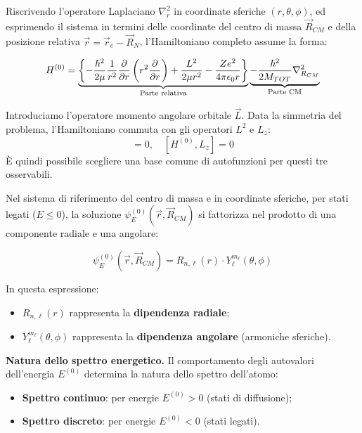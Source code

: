 Riscrivendo l'operatore Laplaciano \(\nabla_r^2\) in coordinate sferiche \((r, \theta, \phi)\), ed esprimendo il sistema in termini delle coordinate del centro di massa \(\vec{R}_{CM}\) e della posizione relativa \(\vec{r} = \vec{r}_e - \vec{R}_N\), l'Hamiltoniano completo assume la forma:

\begin{equation}
    H^{(0)} = \underbrace{\left\{ -\frac{\hbar^2}{2\mu} \frac{1}{r^2} \pdv{r} \left( r^2 \pdv{r} \right) + \frac{L^2}{2\mu r^2} - \frac{Ze^2}{4\pi\epsilon_0 r} \right\}}_{\text{Parte relativa}} \underbrace{- \frac{\hbar^2}{2M_{TOT}} \nabla_{R_{CM}}^2}_{\text{Parte CM}}
\end{equation}

Introduciamo l'operatore momento angolare orbitale \(\vec{L}\). Data la simmetria del problema, l'Hamiltoniano commuta con gli operatori \(L^2\) e \(L_z\):
\begin{equation}
    [H^{(0)}, L^2] = 0, \quad [H^{(0)}, L_z] = 0
\end{equation}
È quindi possibile scegliere una base comune di autofunzioni per questi tre osservabili.

Nel sistema di riferimento del centro di massa e in coordinate sferiche, per stati legati (\(E \le 0\)), la soluzione \(\psi_E^{(0)}(\vec{r}, \vec{R}_{CM})\) si fattorizza nel prodotto di una componente radiale e una angolare:
\begin{importantbox}
    \begin{equation}
    \psi_E^{(0)}(\vec{r}, \vec{R}_{CM}) = R_{n,\ell}(r) \cdot Y_\ell^{m_\ell}(\theta, \phi)    
    \end{equation}
\end{importantbox}
In questa espressione:
\begin{itemize}
    \item \(R_{n,\ell}(r)\) rappresenta la \textbf{dipendenza radiale};
    \item \(Y_\ell^{m_\ell}(\theta, \phi)\) rappresenta la \textbf{dipendenza angolare} (armoniche sferiche).
\end{itemize}

\textbf{Natura dello spettro energetico.} Il comportamento degli autovalori dell'energia \(E^{(0)}\) determina la natura dello spettro dell'atomo:
\begin{itemize}
    \item \textbf{Spettro continuo}: per energie \(E^{(0)} > 0\) (stati di diffusione);
    \item \textbf{Spettro discreto}: per energie \(E^{(0)} < 0\) (stati legati).
\end{itemize}

